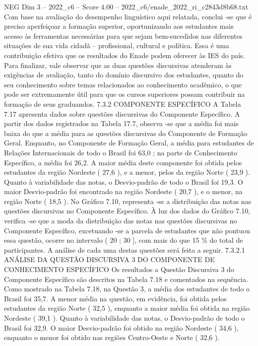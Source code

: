 \begin{textsample}{NEG Dim 3 – 2022\_c6 – Score 4.00 – 2022\_c6/enade\_2022\_ri\_c2843d8b68.txt}
Com base na avaliação do desempenho linguístico aqui relatada, conclui -se que é preciso aperfeiçoar a formação superior, oportunizando aos estudantes mais acesso às ferramentas necessárias para que sejam bem-sucedidos nas diferentes situações de sua vida cidadã – profissional, cultural e política.
Essa é uma contribuição efetiva que os resultados do Enade podem oferecer às IES do país.
Para finalizar, vale observar que as duas questões discursivas atenderam às exigências de avaliação, tanto do domínio discursivo dos estudantes, quanto do seu conhecimento sobre temas relacionados ao conhecimento acadêmico, o que pode ser extremamente útil para que os cursos superiores possam contribuir na formação de seus graduandos. 7.3.2 COMPONENTE ESPECÍFICO A Tabela 7.17 apresenta dados sobre questões discursivas do Componente Específico.
A partir dos dados registrados na Tabela 17.7, observa -se que a média foi mais baixa do que a média para as questões discursivas do Componente de Formação Geral.
Enquanto, no Componente de Formação Geral, a média para estudantes de Relações Internacionais de todo o Brasil foi 63,0 ; na parte de Conhecimento Específico, a média foi 26,2.
A maior média deste componente foi obtida pelos estudantes da região Nordeste ( 27,6 ), e a menor, pelos da região Norte ( 23,9 ).
Quanto à variabilidade das notas, o Desvio-padrão de todo o Brasil foi 19,3.
O maior Desvio-padrão foi encontrado na região Nordeste ( 20,7 ), e o menor, na região Norte ( 18,5 ).
No Gráfico 7.10, representa -se a distribuição das notas nas questões discursivas no Componente Específico.
À luz dos dados do Gráfico 7.10, verifica -se que a moda da distribuição das notas nas questões discursivas no Componente Específico, excetuando -se a parcela de estudantes que não pontuou essa questão, ocorre no intervalo ( 20 ; 30 ], com mais do que 15 \% do total de participantes.
A análise de cada uma destas questões será feita a seguir. 7.3.2.1 ANÁLISE DA QUESTÃO DISCURSIVA 3 DO COMPONENTE DE CONHECIMENTO ESPECÍFICO Os resultados a Questão Discursiva 3 do Componente Específico são descritos na Tabela 7.18 e comentados na sequência.
Como mostrado na Tabela 7.18, na Questão 3, a média dos estudantes de todo o Brasil foi 35,7.
A menor média na questão, em evidência, foi obtida pelos estudantes da região Norte ( 32,5 ), enquanto a maior média foi obtida na região Nordeste ( 39,1 ).
Quanto à variabilidade das notas, o Desvio-padrão de todo o Brasil foi 32,9.
O maior Desvio-padrão foi obtido na região Nordeste ( 34,6 ), enquanto o menor foi obtido nas regiões Centro-Oeste e Norte ( 32,6 ).

\end{textsample}

